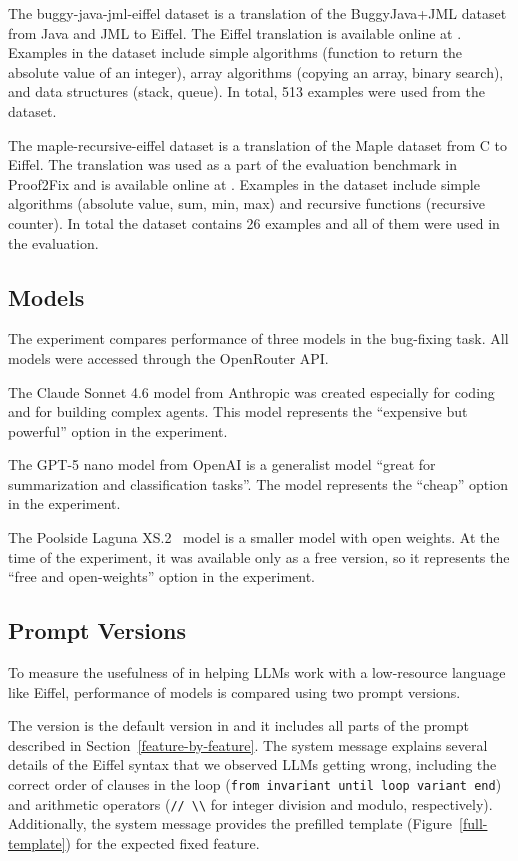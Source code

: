\documentclass[runningheads]{llncs}
\newcommand{\secref}[1]{Section~\ref{#1}}
\newcommand{\figref}[1]{Figure~\ref{#1}}
\begin{document}
The buggy-java-jml-eiffel dataset is a translation of the BuggyJava+JML dataset \cite{buggy-java-jml}
from Java and JML \cite{jml} to Eiffel.
The Eiffel translation is available online at \cite{Mustafin_buggy-java-jml-eiffel_2024}.
Examples in the dataset include
simple algorithms (function to return the absolute value of an integer),
array algorithms (copying an array, binary search),
and data structures (stack, queue).
In total, 513 examples were used from the dataset.

The maple-recursive-eiffel dataset is a translation of the Maple dataset \cite{nguyen2019automatic} from C to Eiffel.
The translation was used as a part of the evaluation benchmark in Proof2Fix \cite{proof2fix}
and is available online at \cite{Mustafin_maple-recursive-eiffel_2024}.
Examples in the dataset include
simple algorithms (absolute value, sum, min, max)
and recursive functions (recursive counter).
In total the dataset contains 26 examples and all of them were used in the
evaluation.

\subsection{Models}
The experiment compares performance of three models in the bug-fixing task.
All models were accessed through the OpenRouter API.

The Claude Sonnet 4.6 model from Anthropic \cite{ClaudeSonnet4.6} was created
especially for coding and for building complex agents. This model
represents the ``expensive but powerful'' option in the experiment.

The GPT-5 nano model from OpenAI \cite{openai-gpt5nano} is a generalist model
``great for summarization and classification tasks''. The model represents the
``cheap'' option in the experiment.

The Poolside Laguna XS.2~\cite{abadji2026laguna} model is a smaller model with
open weights. At the time of the experiment, it was available only as a free version, so it represents
the ``free and open-weights'' option in the experiment.

\subsection{Prompt Versions}\label{prompt-versions}
To measure the usefulness of \toolname{} in helping LLMs work with a low-resource
language like Eiffel, performance of models is compared using
two prompt versions.

The \rich{} version is the default version in \toolname{}
and it includes all parts of the prompt described in \secref{feature-by-feature}.
The system message explains several details of the Eiffel syntax that we observed LLMs getting wrong,
including the correct order of clauses in the loop (\lstinline|from invariant until loop variant end|)
and arithmetic operators (\lstinline|// \\| for integer division and modulo, respectively).
Additionally, the system message provides the prefilled template (\figref{full-template}) for the expected
fixed feature.
\end{document}
